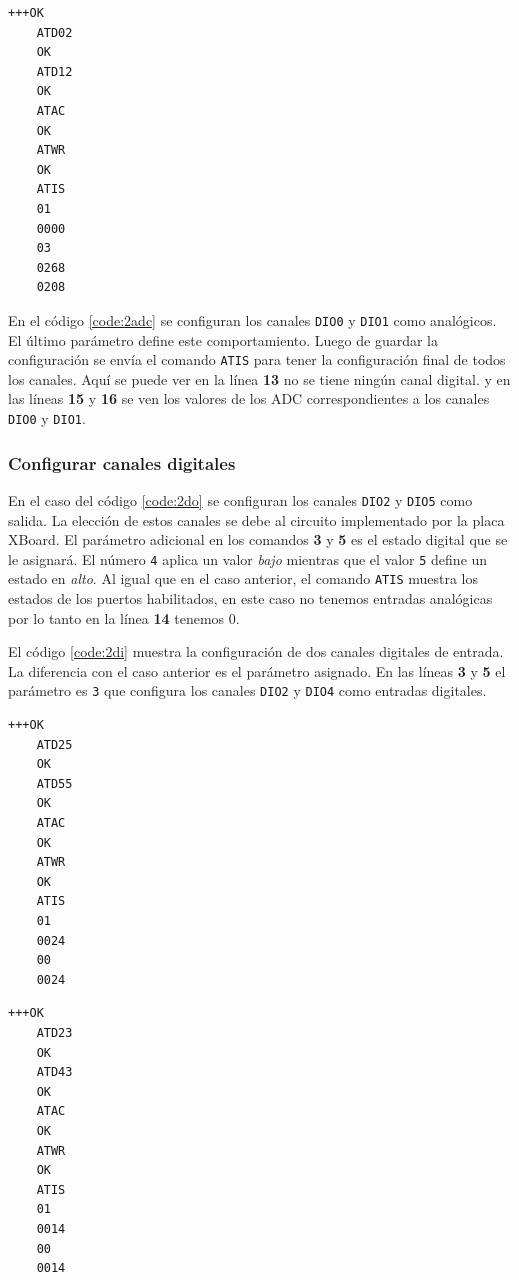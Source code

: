 \documentclass[11pt,oneside,spanish,a4paper]{article}
\begin{document}
\noindent\begin{minipage}{.35\textwidth}
\begin{lstlisting}[emph={+++,ATIS,ATD02,ATD12,ATWR,ATAC},
    emphstyle={\color{blue}},caption={Canales analógicos.},label=code:2adc]
    +++OK
    ATD02
    OK
    ATD12
    OK
    ATAC
    OK
    ATWR
    OK
    ATIS
    01
    0000
    03
    0268
    0208
\end{lstlisting}  
\end{minipage}\hfill
\begin{minipage}{.60\textwidth}
En el código \ref{code:2adc} se configuran los canales \texttt{DIO0}
y \texttt{DIO1} como analógicos. El último parámetro define este
comportamiento. Luego de guardar la configuración se envía el comando
\texttt{ATIS} para tener la configuración final de todos los
canales. Aquí se puede ver en la línea \textbf{13} no se tiene ningún
canal digital. y en las líneas \textbf{15} y \textbf{16} se ven los
valores de los ADC correspondientes a los canales \texttt{DIO0} y
\texttt{DIO1}.
\end{minipage}

\subsubsection{Configurar canales digitales}
En el caso del código \ref{code:2do} se configuran los canales
\texttt{DIO2} y \texttt{DIO5} como salida. La elección de estos
canales se debe al circuito implementado por la placa XBoard. El
parámetro adicional en los comandos \textbf{3} y \textbf{5} es el
estado digital que se le asignará. El número \texttt{4} aplica un
valor \emph{bajo} mientras que el valor \texttt{5} define un estado
en \emph{alto}.  Al igual que en el caso anterior, el comando
\texttt{ATIS} muestra los estados de los puertos habilitados, en este
caso no tenemos entradas analógicas por lo tanto en la línea
\textbf{14} tenemos 0. 

El código \ref{code:2di}  muestra la configuración de dos canales
digitales de entrada. La diferencia con el caso anterior es el
parámetro asignado. En las líneas \textbf{3} y \textbf{5} el parámetro
es \texttt{3} que configura los canales \texttt{DIO2} y \texttt{DIO4}
como entradas digitales. 

\noindent\begin{minipage}{.45\textwidth}
\begin{lstlisting}[emph={+++,ATIS,ATD25,ATD55,ATWR,ATAC},
    emphstyle={\color{blue}}, caption={Dos salidas
      en alto.}, label=code:2do]
    +++OK
    ATD25
    OK
    ATD55
    OK
    ATAC
    OK
    ATWR
    OK
    ATIS
    01
    0024
    00
    0024
\end{lstlisting}  
\end{minipage}\hfill
\begin{minipage}{.45\textwidth}
\begin{lstlisting}[emph={+++,ATIS,ATD23,ATD43,ATWR,ATAC},
    emphstyle={\color{blue}}, caption={Dos entradas},
 label=code:2di]
    +++OK
    ATD23
    OK
    ATD43
    OK
    ATAC
    OK  
    ATWR
    OK
    ATIS
    01
    0014
    00
    0014
\end{lstlisting}  
\end{minipage}
\end{document}
